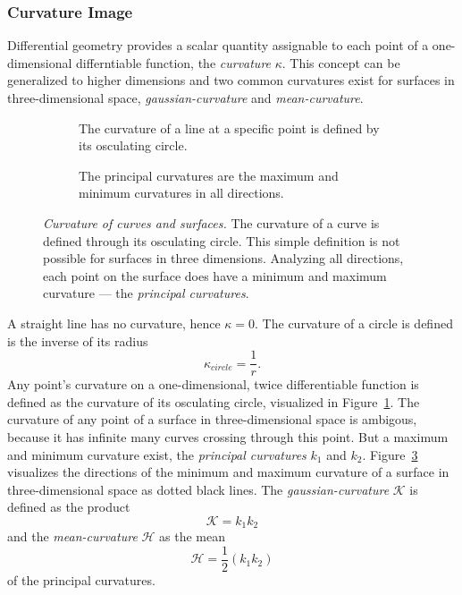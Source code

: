 \subsubsection{Curvature Image}

Differential geometry provides a scalar quantity assignable to each point of a one-dimensional differntiable function, the \emph{\gls{curvature}} $\kappa$\cite[p. 10]{Kuhnel2008}.
This concept can be generalized to higher dimensions and two common \glspl{curvature} exist for surfaces in three-dimensional space, \emph{\gls{gaussian-curvature}} and \emph{\gls{mean-curvature}}.
\begin{figure}[H]
    \begin{subfigure}[t]{0.48\textwidth}
        \centering
        \scalebox{0.85}{%
        
        }
        \caption{The \gls{curvature} of a line at a specific point is defined by its osculating circle.}\label{fig:osculating_circle}
    \end{subfigure}\hfill%
    \begin{subfigure}[t]{0.48\textwidth}
        \centering
        \scalebox{0.85}{%
        
        }
        \caption{The principal curvatures are the maximum and minimum \glspl{curvature} in all directions.}\label{fig:curvature_surface}
    \end{subfigure}
    \caption[Curvature of curves and surfaces]{\emph{Curvature of curves and surfaces.} The \gls{curvature} of a curve is defined through its osculating circle. This simple definition is not possible for surfaces in three dimensions. Analyzing all directions, each point on the surface does have a minimum and maximum \gls{curvature} --- the \emph{principal curvatures}.}
\end{figure}
A straight line has no \gls{curvature}, hence $\kappa = 0$.
The \gls{curvature} of a circle is defined is the inverse of its radius
\begin{equation}
    \kappa_{circle} = \frac{1}{r}\text{.}
\end{equation}
Any point's \gls{curvature} on a one-dimensional, twice differentiable function is defined as the \gls{curvature} of its osculating circle, visualized in Figure~\ref{fig:osculating_circle}.
The \gls{curvature} of any point of a surface in three-dimensional space is ambigous, because it has infinite many curves crossing through this point.
But a maximum and minimum \gls{curvature} exist, the \emph{principal curvatures} $k_1$ and $k_2$.
Figure~\ref{fig:curvature_surface} visualizes the directions of the minimum and maximum \gls{curvature} of a surface in three-dimensional space as dotted black lines.
The \emph{\Gls{gaussian-curvature}} $\mathcal{K}$ is defined as the product
\begin{equation}
    \mathcal{K} = k_1 k_2
\end{equation}
and the \emph{\gls{mean-curvature}} $\mathcal{H}$ as the mean
\begin{equation}
    \mathcal{H} = \frac{1}{2} (k_1 k_2)
\end{equation}
of the principal curvatures.

